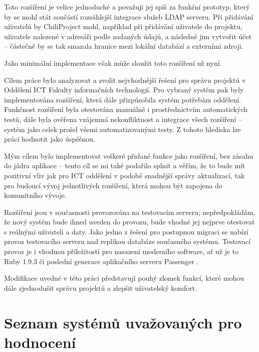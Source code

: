 \documentclass[thesis=B,czech]{FITthesis}[2012/05/02]
\begin{document}
Toto rozšíření je velice jednoduché a považuji jej spíš za funkční
prototyp, který by se mohl stát součástí rozsáhlejší integrace služeb
LDAP serveru. Při přidávání uživatelů by ChiliProject mohl, například
při přidávání uživatele do projektu,  uživatele nalezené v
adresáři podle zadaných údajů, a následně jim vytvořit účet -- částečně
by se tak smazala hranice mezi lokální databází a externími zdroji.

Jako minimální implementace však může sloužit toto rozšíření už nyní.

\begin{conclusion}

Cílem práce bylo analyzovat a zvolit nejvhodnější řešení pro správu projektů v Oddělení ICT Fakulty informačních technologií. Pro vybraný systém pak byly implementována rozšíření, která dále přizpůsobila systém potřebám oddělení. Funkčnost rozšíření byla otestována manuálně i prostřednictvím automatických testů, dále byla ověřena vzájemná nekonfliktnost a integrace všech rozšíření -- systém jako celek prošel všemi automatizovanými testy. Z tohoto hlediska lze práci hodnotit jako úspěšnou.

Mým cílem bylo implementovat veškeré přidané funkce jako rozšíření, bez zásahu do jádra aplikace -- tento cíl se mi také podařilo splnit a věřím, že to bude mít pozitivní vliv jak pro \gls{ICT} oddělení v podobě snadnější správy aktualizací, tak pro budoucí vývoj jednotlivých rozšíření, která mohou být zapojena do komunitního vývoje.

Rozšíření jsou v současnosti provozována na testovacím serveru; nepředpokládám, že nový systém bude ihned uveden do provozu, bude vhodné jej nejprve otestovat s reálnými uživateli a daty. Jako jedno z řešení pro postupnou migraci se nabízí provoz testovacího serveru nad replikou databáze současného systému. Testovací provoz je i vhodnou příležitostí pro nasazení moderního software, ať už je to Ruby 1.9.3 či poslední generace aplikačního serveru Passenger \citep{Passenger32}.

Modifikace uvedné v této práci představují pouhý zlomek funkcí, které mohou dále zjednodušit správu projektů a zlepšit uživatelský komfort.

\end{conclusion}




\appendix

\glsaddall
\printglossaries

\chapter{Seznam systémů uvažovaných pro hodnocení}
\label{chap:seznampm}
\end{document}
